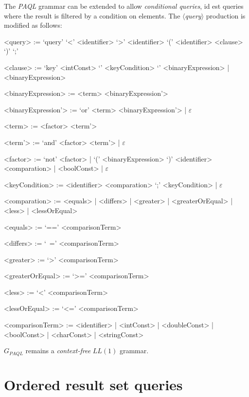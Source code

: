 \documentclass[10pt]{article}  %
\begin{document}
    The \emph{PAQL} grammar can be extended to allow \emph{conditional queries}, id est queries where the result is filtered by a condition
    on elements. The $\langle$\emph{query}$\rangle$ production is modified as follows:
    \vspace{1em}
    \begin{mdframed}
        \begin{grammar}
            <query> := `query' `<' <identifier> `>' <identifier> `(' <identifier> <clause> `)' `;'

            <clause> := `key' <intConst> `{' <keyCondition> `}' <binaryExpression> | <binaryExpression>

            <binaryExpression> := <term> <binaryExpression'>

            <binaryExpression'> := `or' <term> <binaryExpression'> | $\varepsilon$

            <term> := <factor> <term'>

            <term'> := `and' <factor> <term'> | $\varepsilon$

            <factor> := `not' <factor> | `(' <binaryExpression> `)' \alt <identifier> <comparation> | <boolConst> | $\varepsilon$

            <keyCondition> := <identifier> <comparation> `;' <keyCondition> | $\varepsilon$

            <comparation> := <equals> | <differs> | <greater> | <greaterOrEqual> | <less> | <lessOrEqual>

            <equals> := `==' <comparisonTerm>

            <differs> := `~=' <comparisonTerm>

            <greater> := `>' <comparisonTerm>

            <greaterOrEqual> := `>=' <comparisonTerm>

            <less> := `<' <comparisonTerm>

            <lessOrEqual> := `<=' <comparisonTerm>

            <comparisonTerm> := <identifier> | <intConst> | <doubleConst> | <boolConst> | <charConst> | <stringConst>
        \end{grammar}
    \end{mdframed}
    \vspace{1em}
    $G_{PAQL}$ remains a \emph{context-free} $LL(1)$ grammar.
\section{Ordered result set queries}
\end{document}
